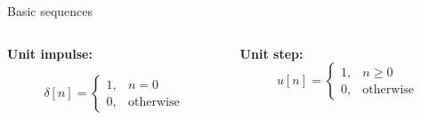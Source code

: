 \documentclass[10pt, handout]{beamer}
\begin{document}
%
\begin{frame}{Basic sequences}
	\begin{columns}[t]
		\begin{column}{0.5\linewidth}
			\textbf{Unit impulse:} 
			
			\begin{equation*}
				\delta[n] = \begin{cases}
				1, & n = 0 \\
				0, & \text{otherwise}
				\end{cases}
			\end{equation*}
		\end{column}		
		
		\begin{column}{0.5\linewidth}
			\textbf{Unit step:} 
			\begin{equation*}
				u[n] = \begin{cases}
				1, & n \geq 0 \\
				0, & \text{otherwise}
				\end{cases}
			\end{equation*}
		\end{column}
	\end{columns}
	\vspace{0.5cm}
	\begin{columns}[t]
	\begin{column}{0.5\linewidth}		
		\centering
		\resizebox{\linewidth}{!}{}
	\end{column}		
	
	\begin{column}{0.5\linewidth}
		\centering
		\resizebox{\linewidth}{!}{}
	\end{column}
\end{columns}
\end{frame}
\end{document}
